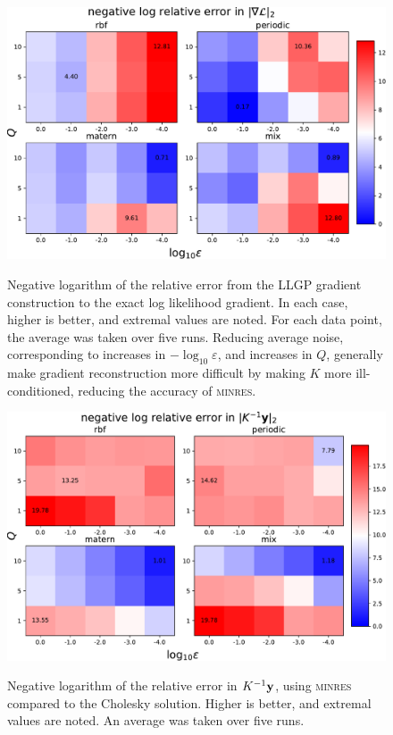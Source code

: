\documentclass{article}
\begin{document}
\begin{figure}[!ht]
  \centering
{\includegraphics[width=\textwidth]{relgrad_l2.pdf}}
\caption{Negative logarithm of the relative error from the LLGP gradient construction to the exact log likelihood gradient. In each case, higher is better, and extremal values are noted.  For each data point, the average was taken over five runs. Reducing average noise, corresponding to increases in $-\log_{10}\varepsilon$, and increases in $Q$, generally make gradient reconstruction more difficult by making $K$ more ill-conditioned, reducing the accuracy of \textsc{minres}.}
\label{fig:relgrad}
\end{figure}

\begin{figure}[!ht]
\centering
{\includegraphics[width=\textwidth]{relalpha_l2.pdf}}
\caption{Negative logarithm of the relative error in $K^{-1}\textbf{y}$, using \textsc{minres} compared to the Cholesky solution. Higher is better, and extremal values are noted. An average was taken over five runs.}
\label{fig:rellog}
\end{figure}



\end{document}
